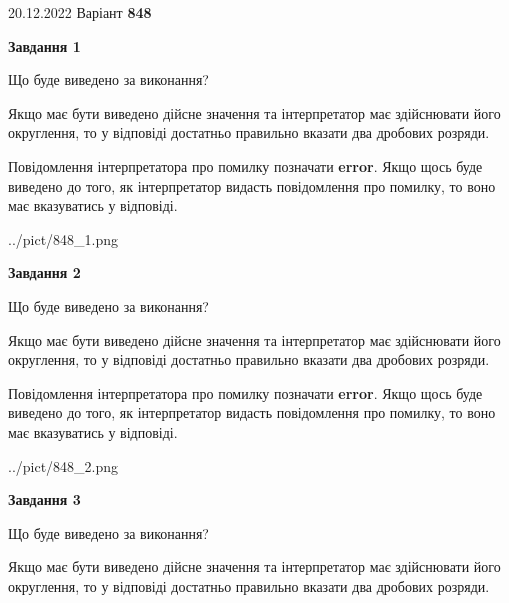 \documentclass[12pt, ukrainian]{article}
\begin{document}
{20.12.2022 Варіант \No \textbf { 848 }\par}
{
\begin {Large}

{\begin {center}\textbf{Завдання 1}\end {center}}\par
Що буде виведено за виконання? \par

Якщо має бути виведено дійсне значення та інтерпретатор має здійснювати його округлення, 
то у відповіді достатньо правильно вказати два дробових розряди.

Повідомлення інтерпретатора про помилку позначати \textbf{error}.
Якщо щось буде виведено до того, як інтерпретатор видасть повідомлення про помилку, 
то воно має вказуватись у відповіді. \par

\begin{center}
	{../pict/848_1.png}
\end{center}
\newpage

{\begin {center}\textbf{Завдання 2}\end {center}}\par
Що буде виведено за виконання? \par

Якщо має бути виведено дійсне значення та інтерпретатор має здійснювати його округлення, 
то у відповіді достатньо правильно вказати два дробових розряди.

Повідомлення інтерпретатора про помилку позначати \textbf{error}.
Якщо щось буде виведено до того, як інтерпретатор видасть повідомлення про помилку, 
то воно має вказуватись у відповіді. \par

\begin{center}
	{../pict/848_2.png}
\end{center}
\newpage

{\begin {center}\textbf{Завдання 3}\end {center}}\par
Що буде виведено за виконання? \par

Якщо має бути виведено дійсне значення та інтерпретатор має здійснювати його округлення, 
то у відповіді достатньо правильно вказати два дробових розряди.


\end{Large}}
\end{document}
